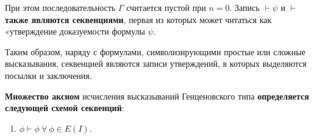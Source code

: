 \documentclass{article}
\begin{document}
При этом последовательность $\Gamma$ считается пустой при $n = 0$. Запись $\vdash \psi$ и $\vdash$ \textbf{также являются секвенциями}, первая из которых может читаться как «утверждение доказуемости формулы $\psi$.

Таким образом, наряду с формулами, символизирующими простые или сложные высказывания, секвенцией являются записи утверждений, в которых выделяются посылки и заключения.

\textbf{Множество аксиом} исчисления высказываний Генценовского типа \textbf{определяется следующей схемой секвенций}:

\begin{enumerate}
    \item $\phi \vdash \phi \ \forall \ \phi \in E(I)$.
\end{enumerate}
\end{document}
